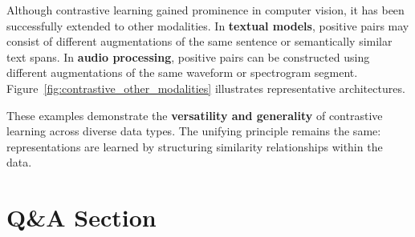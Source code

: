 \documentclass{article}
\begin{document}
Although contrastive learning gained prominence in computer vision, it has been successfully extended to other modalities. In \textbf{textual models}, positive pairs may consist of different augmentations of the same sentence or semantically similar text spans. In \textbf{audio processing}, positive pairs can be constructed using different augmentations of the same waveform or spectrogram segment. Figure~\ref{fig:contrastive_other_modalities} illustrates representative architectures.

These examples demonstrate the \textbf{versatility and generality} of contrastive learning across diverse data types. The unifying principle remains the same: representations are learned by structuring similarity relationships within the data.

\section{Q\&A Section}
\end{document}
